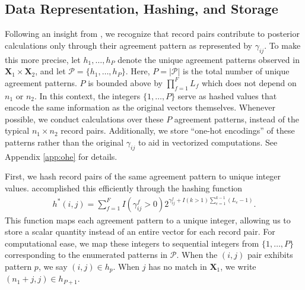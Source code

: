 \documentclass[ba]{imsart}
\begin{document}
\hypertarget{data-representation-hashing-and-storage}{%
	\subsection{Data Representation, Hashing, and
		Storage}\label{data-representation-hashing-and-storage}}

Following an insight from \cite{enamorado2019using}, we recognize that record pairs contribute to posterior calculations only through their agreement pattern as represented by $\gamma_{ij}$. To make this more precise, let $h_1, \ldots, h_P$ denote the unique agreement patterns observed in $\bm{X}_1 \times \bm{X}_2$, and let $\mathcal{P} = \{h_1, \ldots, h_P\}$. Here,  $P = |\mathcal{P}|$ is the total number of unique agreement patterns. \(P\) is bounded above by \(\prod_{f=1}^F L_f\) which does not depend on \(n_1\) or \(n_2\). In this context, the integers $\{1, \ldots, P\}$ serve as hashed values that encode the same information as the original vectors themselves. Whenever possible, we conduct calculations over these \(P\) agreement patterns, instead of the typical \(n_1 \times n_2\) record pairs. Additionally, we store ``one-hot encodings'' of these patterns rather than the original $\gamma_{ij}$ to aid in vectorized computations. See Appendix \ref{app:ohe} for details.   

First, we hash record pairs of the same agreement pattern to unique integer values. \cite{enamorado2019using} accomplished this efficiently through the hashing function
\begin{align}
\label{eqn:hashing}
h^{*}(i, j) = \sum_{f = 1}^F I(\gamma_{ij}^f > 0)2^{\gamma_{ij}^f + I(k>1)\sum_{e=1}^{k-1}(L_e -1)}.
\end{align}
This function maps each agreement pattern to a unique integer, allowing us to store a scalar quantity instead of an entire vector for each record pair. For computational ease, we map these integers to sequential integers from $\{1, \ldots, P\}$ corresponding to the enumerated patterns in $\mathcal{P}$. When the $(i, j)$ pair exhibits pattern $p$, we say $(i, j) \in h_p$. When $j$ has no match in $\bm{X}_1$, we write $(n_1 + j, j) \in h_{P+1}$.
\end{document}
